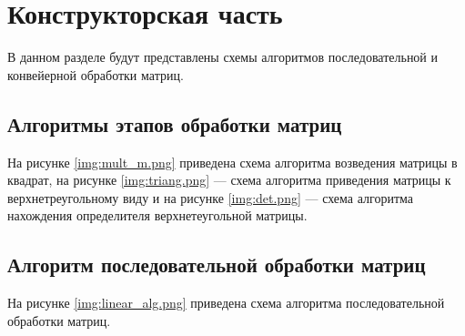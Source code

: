 \chapter{Конструкторская часть}
В данном разделе будут представлены схемы алгоритмов последовательной и конвейерной обработки матриц.

\section{Алгоритмы этапов обработки матриц}
На рисунке \ref{img:mult_m.png} приведена схема алгоритма возведения матрицы в квадрат, на рисунке \ref{img:triang.png} --- схема алгоритма приведения матрицы к верхнетреугольному виду и на рисунке \ref{img:det.png} --- схема алгоритма нахождения определителя верхнетеугольной матрицы.
\clearpage
{}
\clearpage
\section{Алгоритм последовательной обработки матриц}
На рисунке \ref{img:linear_alg.png} приведена схема алгоритма последовательной обработки матриц.
\clearpage
\\
\\
\\
\\
\\
\\
\\
\\
\\
\\
\\
\\
\\
\\
\\
\\
\\
\\
\\
\\
\\
\\


\FloatBarrier
